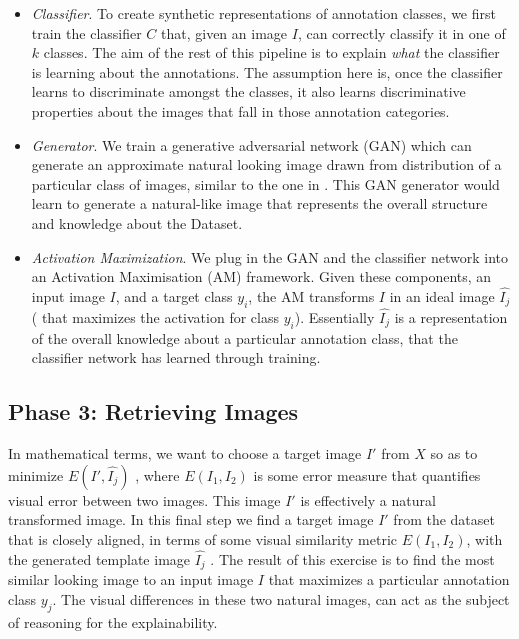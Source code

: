 \begin{itemize}
	\item{\textit{Classifier}}. %
	To create synthetic representations of annotation classes, we first train the classifier $C$%
	that, given an image $I$, can correctly classify it in one of $k$ classes. The aim of the rest of this pipeline is to explain \textit{what} the classifier is learning about the annotations. The assumption here is, once the classifier learns to discriminate amongst the classes, it also learns discriminative properties about the images that fall in those annotation categories. %
	
	\item \textit{Generator}. We train a generative adversarial network (GAN) which can generate an approximate natural looking image drawn from distribution of a particular class of images, similar to the one  in \cite{dosovitskiy2016inverting}. This GAN generator would learn to generate a natural-like image that represents the overall structure and knowledge about the Dataset.
	
	\item \textit{Activation Maximization}. We plug in the GAN and the classifier network into an Activation Maximisation (AM) framework. Given these components, an input image $I$, and a target class $y_i$, the AM transforms $I$ in an ideal image $\hat{I_j}$ ( that maximizes the activation for  class $y_i$). %
	Essentially $\hat{I_j}$  is a representation of the overall knowledge about a particular annotation class, that the classifier network has learned through training. 
\end{itemize}	


\subsection{Phase 3: Retrieving Images }
In mathematical terms, we want to choose a target image $I'$ from $X$ so as to minimize $E(I' , \hat{I_j} )$ , where $E(I_1, I_2)$ is some error measure that quantifies visual error between two images. This image $I'$ is effectively a natural transformed image.
In this final step we find a target image $I'$ from the dataset that is closely aligned, in terms of some visual similarity metric $E(I_1, I_2)$, with the generated template image  $\hat{I_j}$ . The result of this exercise is to find the most similar looking image to an input image $I$ that maximizes a particular annotation class $y_j$.%
The visual differences in these two natural images, can act as the subject of reasoning for the explainability.